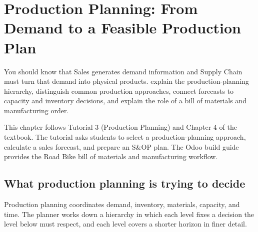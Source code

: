 \chapter{Production Planning: From Demand to a Feasible Production Plan}
\label{ch:production-planning}

\chapterguide
  {You should know that Sales generates demand information and Supply Chain must turn that demand into physical products.}
  {explain the production-planning hierarchy, distinguish common production approaches, connect forecasts to capacity and inventory decisions, and explain the role of a bill of materials and manufacturing order.}

\begin{sourcebasis}
This chapter follows Tutorial 3 (Production Planning) and Chapter 4 of the
textbook. The tutorial asks students to select a production-planning approach,
calculate a sales forecast, and prepare an S\&OP plan. The Odoo build guide
provides the Road Bike bill of materials and manufacturing workflow.
\end{sourcebasis}

\section{What production planning is trying to decide}

Production planning coordinates demand, inventory, materials, capacity, and
time. The planner works down a hierarchy in which each level fixes a decision
the level below must respect, and each level covers a shorter horizon in
finer detail.

